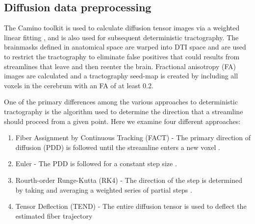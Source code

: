 \documentclass{frontiersSCNS} %
\begin{document}



\subsection{Diffusion data preprocessing}
The Camino toolkit \citep{} is used to calculate diffusion tensor images via a
weighted linear fitting \citep{Basser1994,Salvador2005}, and is also
used for subsequent deterministic tractography. The brainmasks defined
in anatomical space are warped into DTI space and are used to restrict the
tractography to eliminate false positives that could results from
streamlines that leave and then reenter the brain. Fractional anisotropy (FA) images are calculated and a
tractography seed-map is created by including all voxels in the cerebrum with an FA of at
least 0.2. 


One of the primary differences among the various approaches to
deterministic tractography is the algorithm used to determine the
direction that a streamline should proceed from a given point. Here we
examine four different approaches:

\begin{enumerate}
\item Fiber Assignment by Continuous Tracking (FACT) - The primary
  direction of diffusion (PDD) is followed until the streamline enters
  a new voxel \citep{Mori1999}.
\item Euler -  The PDD is followed for a constant step size \citep{Basser2000}.
\item Rourth-order Runge-Kutta (RK4) - The direction of the step is determined
 by taking and averaging a weighted series of partial steps \citep{Basser2000}.
\item Tensor Deflection (TEND) - The entire diffusion tensor is used to deﬂect
the estimated ﬁber trajectory \citep{Lazar2003}
\end{enumerate}
\end{document}
